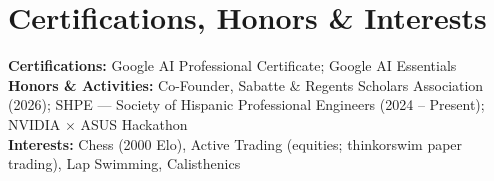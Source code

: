 \documentclass[letterpaper,10pt]{article}
\begin{document}
\section{Certifications, Honors \& Interests}
\noindent\small
\textbf{Certifications:} Google AI Professional Certificate; Google AI Essentials\\[0pt]
\textbf{Honors \& Activities:} Co-Founder, Sabatte \& Regents Scholars Association (2026); SHPE --- Society of Hispanic Professional Engineers (2024 -- Present); NVIDIA $\times$ ASUS Hackathon\\[0pt]
\textbf{Interests:} Chess (2000 Elo), Active Trading (equities; thinkorswim paper trading), Lap Swimming, Calisthenics
\end{document}
